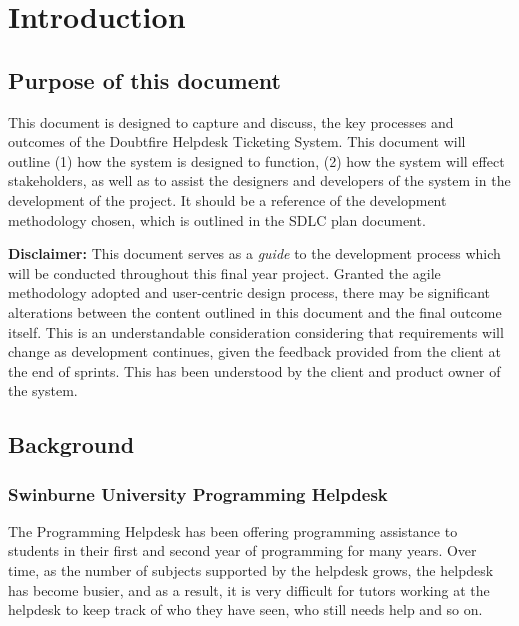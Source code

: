 \documentclass[a4paper,12pt]{article}
\date{}
\begin{document}
{
\setcounter{tocdepth}{3}
\tableofcontents
}
\newpage
\section{Introduction}\label{introduction}

\subsection{Purpose of this document}\label{purpose-of-this-document}

This document is designed to capture and discuss, the key processes and
outcomes of the Doubtfire Helpdesk Ticketing System. This document will
outline (1) how the system is designed to function, (2) how the system
will effect stakeholders, as well as to assist the designers and
developers of the system in the development of the project. It should be
a reference of the development methodology chosen, which is outlined in
the SDLC plan document.

\textbf{Disclaimer:} This document serves as a \emph{guide} to the
development process which will be conducted throughout this final year
project. Granted the agile methodology adopted and user-centric design
process, there may be significant alterations between the content
outlined in this document and the final outcome itself. This is an
understandable consideration considering that requirements will change
as development continues, given the feedback provided from the client at
the end of sprints. This has been understood by the client and product
owner of the system.

\subsection{Background}\label{background}

\subsubsection{Swinburne University Programming
Helpdesk}\label{swinburne-university-programming-helpdesk}

The Programming Helpdesk has been offering programming assistance to
students in their first and second year of programming for many years.
Over time, as the number of subjects supported by the helpdesk grows,
the helpdesk has become busier, and as a result, it is very difficult
for tutors working at the helpdesk to keep track of who they have seen,
who still needs help and so on.
\end{document}
